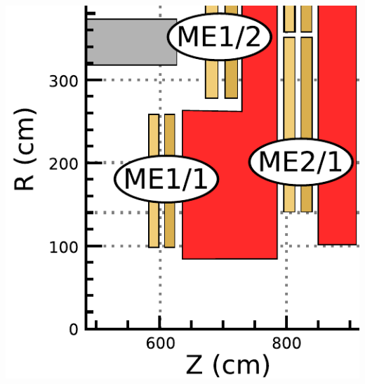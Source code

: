 \documentclass[compress]{beamer}
\begin{document}
\begin{frame}
\begin{columns}
\hspace{0.2 cm} \includegraphics[width=0.7\linewidth]{geometry_me1_me2.pdf}
\end{columns}
\end{frame}
\end{document}
